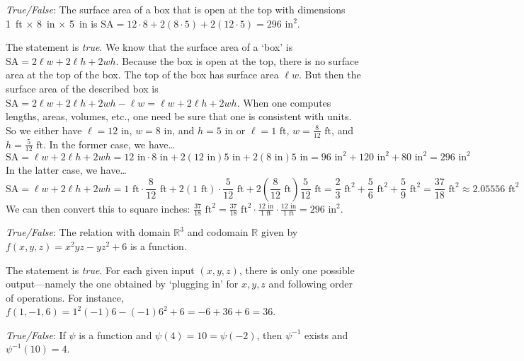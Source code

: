 \documentclass[11pt,letterpaper]{article}
\begin{document}
\quizsol \textit{True/False}: The surface area of a box that is open at the top with dimensions 1~ft $\times$ 8~in $\times$ 5~in is $\text{SA}= 12 \cdot 8 + 2(8 \cdot 5) + 2(12 \cdot 5)= 296 \text{ in}^2$. \pspace

\sol The statement is \textit{true}. We know that the surface area of a `box' is $\text{SA}= 2\ell w + 2 \ell h + 2 wh$. Because the box is open at the top, there is no surface area at the top of the box. The top of the box has surface area $\ell w$. But then the surface area of the described box is $\text{SA}= 2\ell w + 2 \ell h + 2 wh - \ell w= \ell w + 2 \ell h + 2 wh$. When one computes lengths, areas, volumes, etc., one need be sure that one is consistent with units. So we either have $\ell= 12 \text{ in}$, $w= 8 \text{ in}$, and $h= 5 \text{ in}$ or $\ell= 1 \text{ ft}$, $w= \frac{8}{12} \text{ ft}$, and $h= \frac{5}{12} \text{ ft}$. In the former case, we have\dots
	\[
	\text{SA}= \ell w + 2 \ell h + 2 wh= 12 \text{ in} \cdot 8 \text{ in} + 2(12 \text{ in}) 5 \text{ in} + 2(8 \text{ in}) 5 \text{ in}= 96 \text{ in}^2 + 120 \text{ in}^2 + 80 \text{ in}^2= 296 \text{ in}^2
	\]
In the latter case, we have\dots
	\[
	\text{SA}= \ell w + 2 \ell h + 2 wh= 1 \text{ ft} \cdot \frac{8}{12} \text{ ft} + 2(1 \text{ ft}) \cdot \frac{5}{12} \text{ ft} + 2 \left( \frac{8}{12} \text{ ft} \right) \frac{5}{12} \text{ ft}= \dfrac{2}{3} \text{ ft}^2 + \dfrac{5}{6} \text{ ft}^2 + \dfrac{5}{9} \text{ ft}^2= \dfrac{37}{18} \text{ ft}^2 \approx 2.05556 \text{ ft}^2
	\]
We can then convert this to square inches: $\frac{37}{18} \text{ ft}^2= \frac{37}{18} \text{ ft}^2 \cdot \frac{12 \text{ in}}{1 \text{ ft}} \cdot \frac{12 \text{ in}}{1 \text{ ft}}= 296 \text{ in}^2$. \pvspace{1.3cm}



\quizsol \textit{True/False}: The relation with domain $\mathbb{R}^3$ and codomain $\mathbb{R}$ given by $f(x,y,z)= x^2yz - yz^2 + 6$ is a function. \pspace

\sol The statement is \textit{true}. For each given input $(x, y, z)$, there is only one possible output---namely the one obtained by `plugging in' for $x, y, z$ and following order of operations. For instance, $f(1, -1, 6)= 1^2 (-1)6 - (-1) 6^2 + 6= -6 + 36 + 6= 36$. \pvspace{1.3cm}



\quizsol \textit{True/False}: If $\psi$ is a function and $\psi(4)= 10= \psi(-2)$, then $\psi^{-1}$ exists and $\psi^{-1}(10)= 4$. \pspace
\end{document}
